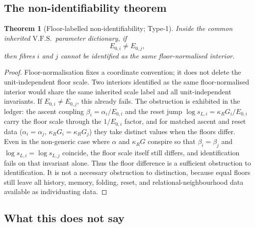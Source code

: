\documentclass[11pt,a4paper]{article}
\newcommand{\VFS}{\ensuremath{\mathrm{V.F.S.}}}
\theoremstyle{definition}
\theoremstyle{plain}
\newtheorem{theorem}[definition]{Theorem}
\theoremstyle{remark}
\begin{document}
\subsection{The non-identifiability theorem}

\begin{theorem}[Floor-labelled non-identifiability; Type-1]\label{thm:floor}
Inside the common inherited \VFS\ parameter dictionary, if
\[
E_{0,i}\neq E_{0,j},
\]
then fibres \(i\) and \(j\) cannot be identified as the same floor-normalised
interior.
\end{theorem}

\begin{proof}
Floor-normalisation fixes a coordinate convention; it does not delete the
unit-independent floor scale. Two interiors identified as the same
floor-normalised interior would share the same inherited scale label and all
unit-independent invariants. If \(E_{0,i}\neq E_{0,j}\), this already fails.
The obstruction is exhibited in the ledger: the ascent coupling
\(\beta_i=\alpha_i/E_{0,i}\) and the reset jump \(\log s_{L,i}=\kappa_R G_i/E_{0,i}\) carry
the floor scale through the \(1/E_{0,i}\) factor, and for matched ascent and reset data
(\(\alpha_i=\alpha_j\), \(\kappa_R G_i=\kappa_R G_j\)) they take distinct values when the
floors differ. Even in the non-generic case where \(\alpha\) and \(\kappa_R G\) conspire
so that \(\beta_i=\beta_j\) and \(\log s_{L,i}=\log s_{L,j}\) coincide, the floor scale
itself still differs, and identification fails on that invariant alone. Thus the floor
difference is a sufficient obstruction to identification. It is not a necessary
obstruction to distinction, because equal floors still leave all history, memory,
folding, reset, and relational-neighbourhood data available as individuating data.
\qedhere
\end{proof}

\subsection{What this does not say}
\end{document}
